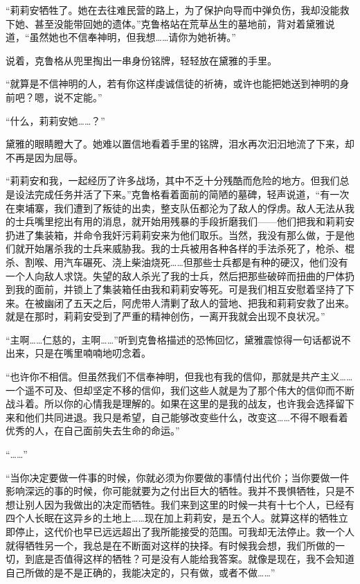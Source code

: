 “莉莉安牺牲了。她在去往难民营的路上，为了保护向导而中弹负伤，我却没能救下她、甚至没能带回她的遗体。”克鲁格站在荒草丛生的墓地前，背对着黛雅说道，“虽然她也不信奉神明，但我想……请你为她祈祷。”

说着，克鲁格从兜里掏出一串身份铭牌，轻轻放在黛雅的手里。

“就算是不信神明的人，若有你这样虔诚信徒的祈祷，或许也能把她送到神明的身前吧？嗯，说不定能。”

“什么，莉莉安她……？”

黛雅的眼睛瞪大了。她难以置信地看着手里的铭牌，泪水再次汩汩地流了下来，却不再是因为屈辱。

“莉莉安和我，一起经历了许多战场，其中不乏十分残酷而危险的地方。但我们总是设法完成任务并活了下来。”克鲁格看着面前的简陋的墓碑，轻声说道，“有一次在柬埔寨，我们遭到了叛徒的出卖，整支队伍都沦为了敌人的俘虏。敌人无法从我的士兵嘴里挖出有用的消息，就开始用残暴的手段折磨我们——他们把我和莉莉安扔进了集装箱，并命令我奸污莉莉安来为他们取乐。当然，我没有那么做，于是他们就开始屠杀我的士兵来威胁我。我的士兵被用各种各样的手法杀死了，枪杀、棍杀、割喉、用汽车碾死、浇上柴油烧死……但那些士兵都是有种的硬汉，他们没有一个人向敌人求饶。失望的敌人杀光了我的士兵，然后把那些破碎而扭曲的尸体扔到我的面前，并锁上了集装箱任由我和莉莉安等死。可是我们相互安慰着坚持了下来。在被幽闭了五天之后，阿虎带人清剿了敌人的营地、把我和莉莉安救了出来。就是在那时，莉莉安受到了严重的精神创伤，一离开我就会出现不良状况。”

“主啊……仁慈的，主啊……”听到克鲁格描述的恐怖回忆，黛雅震惊得一句话都说不出来，只是在嘴里喃喃地叨念着。

“也许你不相信。但虽然我们不信奉神明，但我也有我的信仰，那就是共产主义……一个遥不可及、但却坚定不移的信仰，我们这些人就是为了那个伟大的信仰而不断战斗着。所以你的心情我是理解的。如果在这里的是我的战友，也许我会选择留下来和他们共同进退。我只是希望，自己能够改变些什么，改变这……不得不眼看着优秀的人，在自己面前失去生命的命运。”

“……”

“当你决定要做一件事的时候，你就必须为你要做的事情付出代价；当你要做一件影响深远的事的时候，你可能就要为之付出巨大的牺牲。我并不畏惧牺牲，只是不想让别人因为我做出的决定而牺牲。我们来到这里的时候一共有十七个人，已经有四个人长眠在这异乡的土地上……现在加上莉莉安，是五个人。就算这样的牺牲立即停止，这代价也早已远远超出了我所能接受的范围。可我却无法停止。救一个人就得牺牲另一个，我总是在不断面对这样的抉择。有时候我会想，我们所做的一切，到底是否值得这样的牺牲？可是没有人能给我答案。就像是现在，我不会知道自己所做的是不是正确的，我能决定的，只有做，或者不做……”

